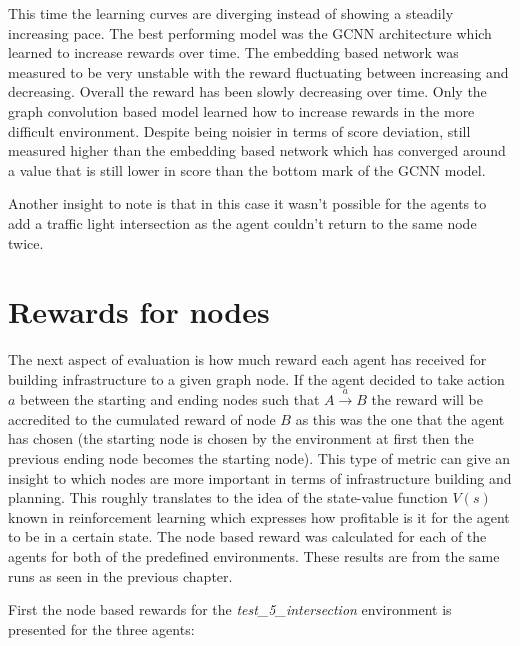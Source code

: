 \documentclass[
]{elteikthesis}[2023/04/10]
\begin{document}
This time the learning curves are diverging instead of showing a steadily
increasing pace. The best performing model was the GCNN architecture
which learned to increase rewards over time. The embedding based network
was measured to be very unstable with the reward fluctuating between
increasing and decreasing. Overall the reward has been slowly decreasing
over time. Only the graph convolution based model learned how to increase
rewards in the more difficult environment. Despite being noisier in
terms of score deviation, still measured higher than the embedding
based network which has converged around a value that is still lower
in score than the bottom mark of the GCNN model. 

Another insight to note is that in this case it wasn't possible for
the agents to add a traffic light intersection as the agent couldn't
return to the same node twice.

\section{Rewards for nodes}

The next aspect of evaluation is how much reward each agent has received
for building infrastructure to a given graph node. If the agent decided
to take action $a$ between the starting and ending nodes such that
$A\overset{a}{\rightarrow}B$ the reward will be accredited to the
cumulated reward of node $B$ as this was the one that the agent has
chosen (the starting node is chosen by the environment at first then
the previous ending node becomes the starting node). This type of
metric can give an insight to which nodes are more important in terms
of infrastructure building and planning. This roughly translates to
the idea of the state-value function $V(s)$ known in reinforcement
learning which expresses how profitable is it for the agent to be
in a certain state. The node based reward was calculated for each
of the agents for both of the predefined environments. These results
are from the same runs as seen in the previous chapter.

First the node based rewards for the \emph{test\_5\_intersection}
environment is presented for the three agents:
\end{document}
